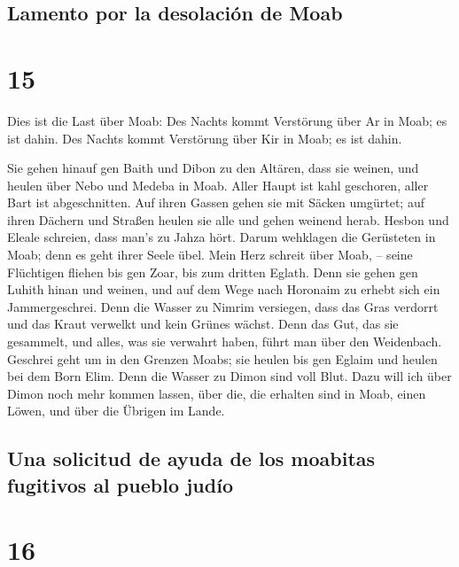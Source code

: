 \hypertarget{lamento-por-la-desolaciuxf3n-de-moab}{%
\subsection{Lamento por la desolación de
Moab}\label{lamento-por-la-desolaciuxf3n-de-moab}}

\hypertarget{section-14}{%
\section{15}\label{section-14}}

 Dies ist die Last über Moab: Des Nachts kommt Verstörung
über Ar in Moab; es ist dahin. Des Nachts kommt Verstörung über Kir in
Moab; es ist dahin.

 Sie gehen hinauf gen Baith und Dibon zu den Altären, dass
sie weinen, und heulen über Nebo und Medeba in Moab. Aller Haupt ist
kahl geschoren, aller Bart ist abgeschnitten.  Auf ihren
Gassen gehen sie mit Säcken umgürtet; auf ihren Dächern und Straßen
heulen sie alle und gehen weinend herab.  Hesbon und
Eleale schreien, dass man's zu Jahza hört. Darum wehklagen die
Gerüsteten in Moab; denn es geht ihrer Seele übel.  Mein
Herz schreit über Moab, -- seine Flüchtigen fliehen bis gen Zoar, bis
zum dritten Eglath. Denn sie gehen gen Luhith hinan und weinen, und auf
dem Wege nach Horonaim zu erhebt sich ein Jammergeschrei. 
Denn die Wasser zu Nimrim versiegen, dass das Gras verdorrt und das
Kraut verwelkt und kein Grünes wächst.  Denn das Gut, das
sie gesammelt, und alles, was sie verwahrt haben, führt man über den
Weidenbach.  Geschrei geht um in den Grenzen Moabs; sie
heulen bis gen Eglaim und heulen bei dem Born Elim.  Denn
die Wasser zu Dimon sind voll Blut. Dazu will ich über Dimon noch mehr
kommen lassen, über die, die erhalten sind in Moab, einen Löwen, und
über die Übrigen im Lande.

\hypertarget{una-solicitud-de-ayuda-de-los-moabitas-fugitivos-al-pueblo-juduxedo}{%
\subsection{Una solicitud de ayuda de los moabitas fugitivos al pueblo
judío}\label{una-solicitud-de-ayuda-de-los-moabitas-fugitivos-al-pueblo-juduxedo}}

\hypertarget{section-15}{%
\section{16}\label{section-15}}


